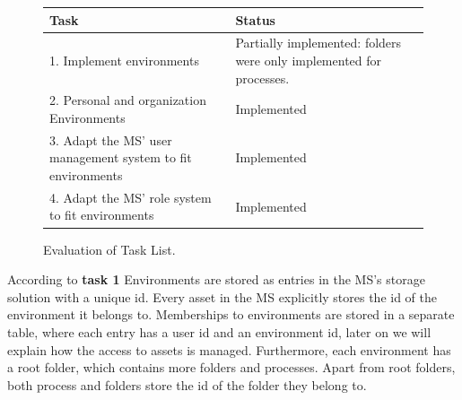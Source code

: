 \begin{figure}[H]
	\centering

	\begin{tabular}{ | m{20em} | m{17em}| }
		\hline
		 Task & Status \\
     \hline
      1. Implement environments &  Partially implemented: folders were only implemented for processes. \\
     \hline
      2. Personal and organization Environments &  Implemented \\
     \hline
      3. Adapt the MS' user management system to fit environments &  Implemented \\
     \hline
      4. Adapt the MS' role system to fit environments &  Implemented \\
     \hline
	\end{tabular}

	\caption{Evaluation of Task List.}
	\label{fig:task-list-functional-quick-evaluation}
\end{figure}

According to \textbf{task 1} Environments are stored as entries in the MS's storage
solution with a unique id.
Every asset in the MS explicitly stores the id of the environment it belongs to.
Memberships to environments are stored in a separate table, where each entry has a user id
and an environment id,
later on we will explain how the access to assets is managed.
Furthermore, each environment has a root folder, which contains more folders and
processes.
Apart from root folders, both process and folders store the id of the folder they belong
to.

